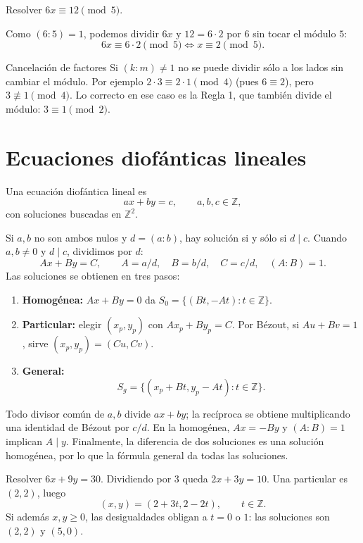 \begin{ejemplo}
Resolver $6x\equiv 12 \pmod 5$.

Como $(6:5)=1$, podemos dividir $6x$ y $12=6\cdot 2$ por $6$ sin tocar el
módulo $5$:
\[
6x\equiv 6\cdot 2 \pmod 5 \iff x\equiv 2 \pmod 5.
\]
\end{ejemplo}

\begin{nota}{Cancelación de factores}
Si $(k:m)\neq 1$ no se puede dividir sólo a los lados sin cambiar el módulo. Por
ejemplo $2\cdot 3\equiv 2\cdot 1 \pmod 4$ (pues $6\equiv 2$), pero
$3\not\equiv 1 \pmod 4$. Lo correcto en ese caso es la Regla 1, que también
divide el módulo: $3\equiv 1 \pmod 2$.
\end{nota}

\section{Ecuaciones diofánticas lineales}
\begin{definicion}
Una ecuación diofántica lineal es
\[
ax+by=c,\qquad a,b,c\in\mathbb Z,
\]
con soluciones buscadas en $\mathbb Z^2$.
\end{definicion}
\begin{proposicion}[{title={Existencia y solución general}}]
Si $a,b$ no son ambos nulos y $d=(a:b)$, hay solución si y sólo si $d\mid c$.
Cuando $a,b\neq0$ y $d\mid c$, dividimos por $d$:
\[
Ax+By=C,\qquad A=a/d,\quad B=b/d,\quad C=c/d,\quad(A:B)=1.
\]
Las soluciones se obtienen en tres pasos:
\begin{enumerate}
\item \textbf{Homogénea:} $Ax+By=0$ da
$S_0=\{(Bt,-At):t\in\mathbb Z\}$.
\item \textbf{Particular:} elegir $(x_p,y_p)$ con $Ax_p+By_p=C$.
Por Bézout, si $Au+Bv=1$, sirve $(x_p,y_p)=(Cu,Cv)$.
\item \textbf{General:}
\[
\boxed{S_g=\{(x_p+Bt,y_p-At):t\in\mathbb Z\}.}
\]
\end{enumerate}
\end{proposicion}
\begin{demostracion}
Todo divisor común de $a,b$ divide $ax+by$; la recíproca se obtiene
multiplicando una identidad de Bézout por $c/d$.
En la homogénea, $Ax=-By$ y $(A:B)=1$ implican $A\mid y$.
Finalmente, la diferencia de dos soluciones es una solución homogénea,
por lo que la fórmula general da todas las soluciones.
\end{demostracion}
\begin{ejemplo}
Resolver $6x+9y=30$. Dividiendo por $3$ queda $2x+3y=10$.
Una particular es $(2,2)$, luego
\[
(x,y)=(2+3t,2-2t),\qquad t\in\mathbb Z.
\]
Si además $x,y\geq0$, las desigualdades obligan a $t=0$ o $1$:
las soluciones son $(2,2)$ y $(5,0)$.
\end{ejemplo}
